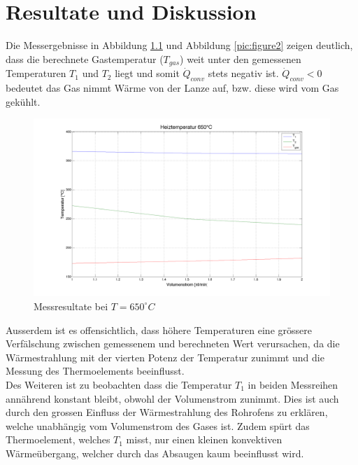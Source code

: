 \chapter{Resultate und Diskussion}\label{sec:results}

Die Messergebnisse in Abbildung \ref{pic:figure1} und Abbildung \ref{pic:figure2} zeigen deutlich, dass die berechnete Gastemperatur ($T_{gas}$) weit unter den gemessenen Temperaturen $T_1$ und $T_2$ liegt und somit $\dot Q_{conv}$ stets negativ ist. $\dot Q_{conv} < 0$ bedeutet das Gas nimmt Wärme von der Lanze auf, bzw. diese wird vom Gas gekühlt.

\begin{figure}[H]
\includegraphics[width=\textwidth]{pics/figure1.png}
\caption{Messresultate bei $T= 650^\circ C$}
\label{pic:figure1}
\end{figure}

Ausserdem ist es offensichtlich, dass  höhere Temperaturen eine  grössere Verfälschung zwischen gemessenem und berechneten Wert verursachen, da die Wärmestrahlung mit der vierten Potenz der Temperatur zunimmt und die Messung des Thermoelements beeinflusst.\\

Des Weiteren ist zu beobachten dass die Temperatur $T_1$ in beiden Messreihen annährend konstant bleibt, obwohl der Volumenstrom zunimmt. Dies ist auch durch den grossen Einfluss der Wärmestrahlung des Rohrofens zu erklären, welche unabhängig vom Volumenstrom des Gases ist. Zudem spürt das Thermoelement, welches $T_1$ misst, nur einen kleinen konvektiven Wärmeübergang, welcher durch das Absaugen kaum beeinflusst wird. 

